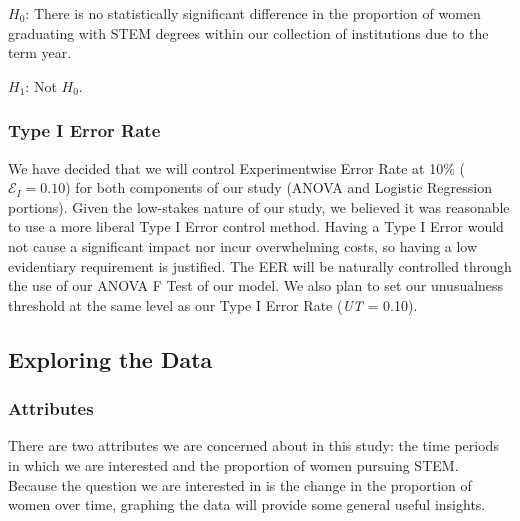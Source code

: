 \documentclass[]{article}
\begin{document}
\(H_0\): There is no statistically significant difference in the
proportion of women graduating with STEM degrees within our collection
of institutions due to the term year.

\(H_1\): Not \(H_0\).

\subsubsection{Type I Error Rate}\label{type-i-error-rate}

We have decided that we will control Experimentwise Error Rate at 10\%
(\(\mathcal{E}_{I}=0.10\)) for both components of our study (ANOVA and
Logistic Regression portions). Given the low-stakes nature of our study,
we believed it was reasonable to use a more liberal Type I Error control
method. Having a Type I Error would not cause a significant impact nor
incur overwhelming costs, so having a low evidentiary requirement is
justified. The EER will be naturally controlled through the use of our
ANOVA F Test of our model. We also plan to set our unusualness threshold
at the same level as our Type I Error Rate (\emph{UT} = 0.10).

\subsection{Exploring the Data}\label{exploring-the-data}

\subsubsection{Attributes}\label{attributes}

There are two attributes we are concerned about in this study: the time
periods in which we are interested and the proportion of women pursuing
STEM. Because the question we are interested in is the change in the
proportion of women over time, graphing the data will provide some
general useful insights.
\end{document}
